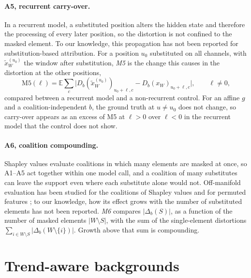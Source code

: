 \documentclass{article}
\begin{document}
\paragraph{A5, recurrent carry-over.} In a recurrent model, a substituted position alters the hidden state and therefore the processing of every later position, so the distortion is not confined to the masked element. To our knowledge, this propagation has not been reported for substitution-based attribution. For a position $u_0$ substituted on all channels, with $\tilde x^{(u_0)}_W$ the window after substitution, \emph{M5} is the change this causes in the distortion at the other positions,
\begin{equation}\label{eq:m5}
\mathrm{M5}(\ell) = \mathbb{E}\sum_c \bigl|D_b(\tilde x^{(u_0)}_W)_{u_0+\ell,c}-D_b(x_W)_{u_0+\ell,c}\bigr|, \qquad \ell\neq 0,
\end{equation}
compared between a recurrent model and a non-recurrent control. For an affine $g$ and a coalition-independent $b$, the ground truth at $u\neq u_0$ does not change, so carry-over appears as an excess of M5 at $\ell>0$ over $\ell<0$ in the recurrent model that the control does not show.

\paragraph{A6, coalition compounding.} Shapley values evaluate coalitions in which many elements are masked at once, so A1--A5 act together within one model call, and a coalition of many substitutes can leave the support even where each substitute alone would not. Off-manifold evaluation has been studied for the coalitions of Shapley values and for permuted features \citep{frye2021shapley, hooker2021unrestricted}; to our knowledge, how its effect grows with the number of substituted elements has not been reported. \emph{M6} compares $|\Delta_b(S)|$, as a function of the number of masked elements $|W\setminus S|$, with the sum of the single-element distortions $\sum_{i\in W\setminus S}|\Delta_b(W\setminus\{i\})|$. Growth above that sum is compounding.


\section{Trend-aware backgrounds}
\label{sec:tab}
\end{document}
